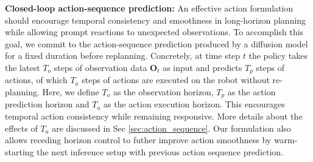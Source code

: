 \documentclass[Afour,sageh,times]{sagej}
\newcommand{\shuran}[1]{\textcolor{MyDarkGreen}{[Shuran: #1]}}
\begin{document}
\textbf{Closed-loop action-sequence prediction:}
An effective action formulation should encourage temporal consistency and smoothness in long-horizon planning while allowing prompt reactions to unexpected observations. 
To accomplish this goal, we commit to the action-sequence prediction produced by a diffusion model for a fixed duration before replanning. 
Concretely, at time step $t$ the policy takes the latest $T_o$ steps of observation data $\mathbf{O}_t$ as input and predicts $T_p$ steps of actions, of which $T_a$ steps of actions are executed on the robot without re-planning. Here, we define $T_o$ as the observation horizon, $T_p$ as the action prediction horizon and $T_a$ as the action execution horizon. 
This encourages temporal action consistency while remaining responsive. More details about the effects of $T_a$ are discussed in Sec \ref{sec:action_sequence}.
Our formulation also allows receding horizon control \cite{mayne1988receding} to futher improve action smoothness by warm-starting the next inference setup with previous action sequence prediction.
\end{document}
